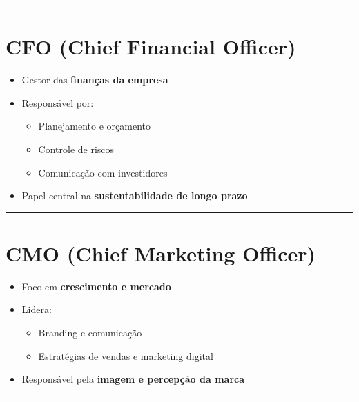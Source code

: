 \documentclass[
]{book}
\providecommand{\tightlist}{%
  \setlength{\itemsep}{0pt}\setlength{\parskip}{0pt}}
\begin{document}
\begin{center}\rule{0.5\linewidth}{0.5pt}\end{center}

\section{CFO (Chief Financial Officer)}\label{cfo-chief-financial-officer}

\begin{itemize}
\tightlist
\item
  Gestor das \textbf{finanças da empresa}
\item
  Responsável por:

  \begin{itemize}
  \tightlist
  \item
    Planejamento e orçamento
  \item
    Controle de riscos
  \item
    Comunicação com investidores
  \end{itemize}
\item
  Papel central na \textbf{sustentabilidade de longo prazo}
\end{itemize}

\begin{center}\rule{0.5\linewidth}{0.5pt}\end{center}

\section{CMO (Chief Marketing Officer)}\label{cmo-chief-marketing-officer}

\begin{itemize}
\tightlist
\item
  Foco em \textbf{crescimento e mercado}
\item
  Lidera:

  \begin{itemize}
  \tightlist
  \item
    Branding e comunicação
  \item
    Estratégias de vendas e marketing digital
  \end{itemize}
\item
  Responsável pela \textbf{imagem e percepção da marca}
\end{itemize}

\begin{center}\rule{0.5\linewidth}{0.5pt}\end{center}
\end{document}
